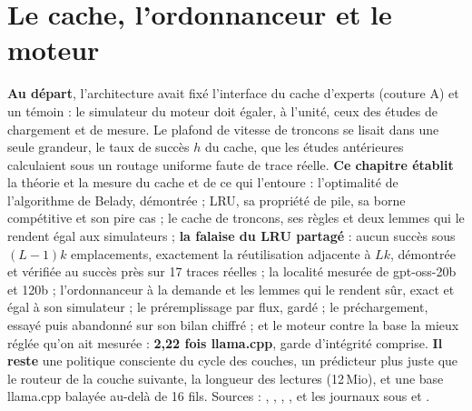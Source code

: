 \ifdefined\GrapheCchFalaise\else\fi

\chapter{Le cache, l'ordonnanceur et le moteur}\label{ch:t2-cache}

\begin{origine}
\textbf{Au départ}, l'architecture avait fixé l'interface du cache d'experts (couture A) et un témoin : le simulateur du moteur doit égaler, à l'unité, ceux des études de chargement et de mesure. Le plafond de vitesse de troncons se lisait dans une seule grandeur, le taux de succès $h$ du cache, que les études antérieures calculaient sous un routage uniforme faute de trace réelle.
\textbf{Ce chapitre établit} la théorie et la mesure du cache et de ce qui l'entoure : l'optimalité de l'algorithme de Belady, démontrée ; LRU, sa propriété de pile, sa borne compétitive et son pire cas ; le cache de troncons, ses règles et deux lemmes qui le rendent égal aux simulateurs ; \textbf{la falaise du LRU partagé} : aucun succès sous $(L-1)k$ emplacements, exactement la réutilisation adjacente à $Lk$, démontrée et vérifiée au succès près sur 17 traces réelles ; la localité mesurée de gpt-oss-20b et 120b ; l'ordonnanceur à la demande et les lemmes qui le rendent sûr, exact et égal à son simulateur ; le préremplissage par flux, gardé ; le préchargement, essayé puis abandonné sur son bilan chiffré ; et le moteur contre la base la mieux réglée qu'on ait mesurée : \textbf{2,22 fois llama.cpp}, garde d'intégrité comprise.
\textbf{Il reste} une politique consciente du cycle des couches, un prédicteur plus juste que le routeur de la couche suivante, la longueur des lectures (12\,Mio), et une base llama.cpp balayée au-delà de 16 fils.
Sources : , , , , et les journaux sous  et .
\end{origine}


